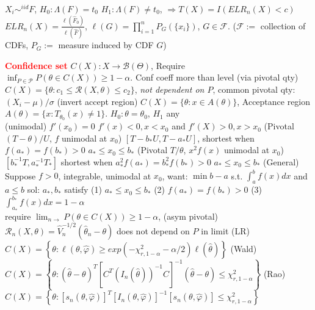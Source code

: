\documentclass{article}
\renewcommand{\section}[1]{\textcolor{red}{\textbf{#1}}}
\renewcommand{\subsection}[1]{\text{\hl{[#1]}}}
\newcommand{\compact}{\\}
\begin{document}
\subsection{Empirical LR}
$X_i \sim^{iid} F$,
$H_0: \Lambda(F)=t_0$ $H_1: \Lambda(F) \neq t_0$,
$\Rightarrow T(X) = I(ELR_n(X) < c)$
$ELR_n(X) = \frac{\ell(\hat{F}_0)}{\ell(\hat{F})}$,
$\ell(G) = \prod_{i=1}^n P_G(\{x_i\})$, $G \in \mathcal{F}$.
($\mathcal{F} :=$ collection of CDFs, $P_G :=$ measure induced by CDF $G$)

\section{Confidence set}
$C(X): X \rightarrow \mathcal{B}(\Theta)$,
Require $\inf_{P\in\mathcal{P}} P(\theta\in C(X)) \geq 1 - \alpha$.
Conf coeff more than level
(via pivotal qty)
$C(X) = \{\theta: c_1 \leq \mathcal{R}(X, \theta) \leq c_2\}$,
\textit{not dependent on $P$}, common pivotal qty: $(X_i-\mu)/\sigma$
(invert accept region)
$C(X) = \{\theta: x\in A(\theta)\}$, Acceptance region $A(\theta)=\{x:
    T_{\theta_0}(x) \neq 1\}$.
$H_0: \theta = \theta_0$, $H_1$ any
\compact
\subsection{Shortest CI}
(unimodal)
$f'(x_0) = 0$ $f'(x)<0, x < x_0$ and $f'(X)>0, x > x_0$
(Pivotal $(T-\theta)/U$, $f$ unimodal at $x_0$)
$[T - b_*U, T-a_* U]$, shortest when
$f(a_*) = f(b_*) > 0$
$a_* \leq x_0 \leq b_*$
(Pivotal $T/\theta$, $x^2f(x)$ unimodal at $x_0$)
$[b_*^{-1}T, a_*^{-1}T_*]$ shortest when
$a^2_*f(a_*) = b^2_*f(b_*) > 0$
$a_* \leq x_0 \leq b_*$
(General)
Suppose $f > 0$, integrable, unimodal at $x_0$,
want: $\min b - a$ s.t.
$\int_a^b f(x) dx$ and $a \leq b$
sol: $a_*, b_*$ satisfy
(1) $a_* \leq x_0 \leq b_*$
(2) $f(a_*) = f(b_*) > 0$
(3) $\int_{a_*}^{b_*} f(x) dx = 1- \alpha$
\compact
\subsection{asym}
require $\lim_{n\rightarrow}P(\theta\in C(X)) \geq 1 - \alpha$,
(asym pivotal)
$\mathcal{R}_n(X, \theta) = \hat V_n^{-1/2} (\hat\theta_n - \theta)$
does not depend on $P$ in limit
(LR)
$C(X) = \left\{\theta: \ell(\theta, \hat\varphi) \geq
    exp(-\chi_{r, 1-\alpha}^2-\alpha/2)\ell(\hat\theta)\right\}$
(Wald)
$C(X) = \left\{
    \theta: (\hat\theta - \theta)^T \left[
        C^T \left(
        I_n(\hat\theta)
        \right)^{-1}
        C
        \right]^{-1}
    (\hat\theta - \theta) \leq \chi_{r, 1-\alpha}^2
    \right\}$
(Rao)
$C(X) = \left\{
    \theta:
    \left[ s_n(\theta, \hat\varphi) \right]^T
    \left[ I_n(\theta, \hat\varphi) \right]^{-1}
    \left[ s_n(\theta, \hat\varphi) \right]
    \leq \chi_{r, 1-\alpha}^2
    \right\}$
\end{document}
